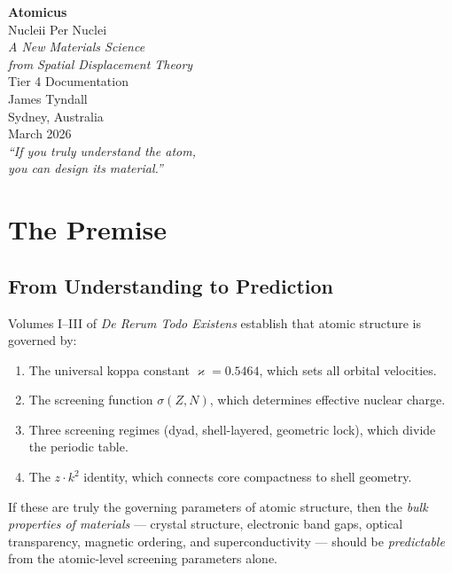 \documentclass[12pt,a4paper]{report}
\newcommand{\kop}{\varkappa}
\begin{document}
\begin{titlepage}
\centering
\vspace*{4cm}
{\Huge\bfseries Atomicus\\[0.3cm]}
{\LARGE Nucleii Per Nuclei\\[1cm]}
{\Large\itshape A New Materials Science\\
from Spatial Displacement Theory\\[2cm]}
{\large Tier 4 Documentation\\[1cm]}
{\Large James Tyndall\\[0.5cm]}
{\large Sydney, Australia\\[0.5cm]}
{\large March 2026\\[3cm]}
{\normalsize\textit{``If you truly understand the atom,\\you can design its material.''}}
\end{titlepage}

\tableofcontents
\newpage


\chapter{The Premise}

\section{From Understanding to Prediction}

Volumes I--III of \textit{De Rerum Todo Existens} establish that atomic structure is governed by:
\begin{enumerate}
  \item The universal koppa constant $\kop = 0.5464$, which sets all orbital velocities.
  \item The screening function $\sigma(Z, N)$, which determines effective nuclear charge.
  \item Three screening regimes (dyad, shell-layered, geometric lock), which divide the periodic table.
  \item The $z \cdot k^2$ identity, which connects core compactness to shell geometry.
\end{enumerate}

If these are truly the governing parameters of atomic structure, then the \emph{bulk properties of materials} --- crystal structure, electronic band gaps, optical transparency, magnetic ordering, and superconductivity --- should be \emph{predictable} from the atomic-level screening parameters alone.
\end{document}
